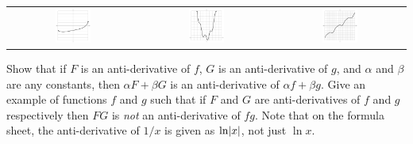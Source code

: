 \begin{questions}
\begin{center}
\begin{tabular}{ccc}
                \includegraphics[width=0.28\textwidth]{anti4}&
                \includegraphics[width=0.28\textwidth]{anti5}&
                \includegraphics[width=0.28\textwidth]{anti6}
              \end{tabular}
            \end{center}
  \questioE Show that if $ F $ is an anti-derivative of $ f $, $ G $ is an anti-derivative of $ g $, and $ \alpha $ and $ \beta $ are any constants,
            then $ \alpha F + \beta G $ is an anti-derivative of $ \alpha f + \beta g $.
  \questioE Give an example of functions $ f $ and $ g $ such that if $ F $ and $ G $ are anti-derivatives of $ f $ and $ g $ respectively then $ FG $
            is \emph{not} an anti-derivative of $ fg $.
  \questioE Note that on the formula sheet, the anti-derivative of $ 1/x $ is given as $ \ln \abs{x} $, not just $ \ln x $.
\end{questions}


